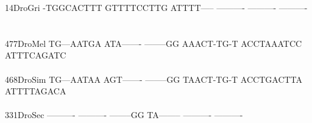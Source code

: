 \documentclass[11pt,twoside,reqno,a4paper]{article}
\begin{document}
{14\hspace*{3\charwidth}DroGri	-TGGCACTTT	GTTTTCCTTG	ATTTT-----	----------	----------	----------	\\
\hspace*{5\charwidth}\hspace*{7\charwidth}\hspace*{1\charwidth}\hspace*{1\charwidth}\hspace*{1\charwidth}\hspace*{1\charwidth}\hspace*{1\charwidth}\hspace*{1\charwidth}\\
\\
477\hspace*{2\charwidth}DroMel	TG---AATGA	ATA-------	--------GG	AAACT-TG-T	ACCTAAATCC	ATTTCAGATC	\\
\hspace*{5\charwidth}\hspace*{7\charwidth}\hspace*{1\charwidth}\hspace*{1\charwidth}\hspace*{1\charwidth}\hspace*{1\charwidth}\hspace*{1\charwidth}\hspace*{1\charwidth}\\
468\hspace*{2\charwidth}DroSim	TG---AATAA	AGT-------	--------GG	TAACT-TG-T	ACCTGACTTA	ATTTTAGACA	\\
\hspace*{5\charwidth}\hspace*{7\charwidth}\hspace*{1\charwidth}\hspace*{1\charwidth}\hspace*{1\charwidth}\hspace*{1\charwidth}\hspace*{1\charwidth}\hspace*{1\charwidth}\\
331\hspace*{2\charwidth}DroSec	----------	----------	--------GG	TA--------	----------	----------	\\
\hspace*{5\charwidth}\hspace*{7\charwidth}\hspace*{1\charwidth}\hspace*{1\charwidth}\hspace*{1\charwidth}\hspace*{1\charwidth}\hspace*{1\charwidth}\hspace*{1\charwidth}\\
}
\end{document}
